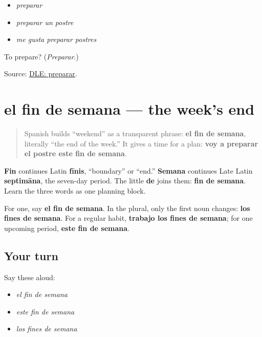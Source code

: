 \begin{itemize}
\raggedright
  \item \emph{preparar}
  \item \emph{preparar un postre}
  \item \emph{me gusta preparar postres}
\end{itemize}

\begin{tcolorbox}[breakable,colback=teal!4,colframe=teal!35!black,title={Before you move on}]
To prepare? (\emph{Preparar}.)

Source: \href{https://dle.rae.es/preparar}{DLE: preparar}.
\end{tcolorbox}
\section[el fin de semana]{el fin de semana — the week's end}

\label{lesson:ES-C409-fin-de-semana}



\begin{quote}
Spanish builds “weekend” as a transparent phrase: \textbf{el fin de semana}, literally “the end of the week.” It gives a time for a plan: \textbf{voy a preparar el postre este fin de semana}.
\end{quote}

\begin{cousinweb}
\textbf{Fin} continues Latin \textbf{fīnis}, “boundary” or “end.” \textbf{Semana} continues Late Latin \textbf{septimāna}, the seven-day period. The little \textbf{de} joins them: \textbf{fin de semana}. Learn the three words as one planning block.
\end{cousinweb}

\begin{grammarlens}[title={Grammar Lens: one weekend, many weekends}]
For one, say \textbf{el fin de semana}. In the plural, only the first noun changes: \textbf{los fines de semana}. For a regular habit, \textbf{trabajo los fines de semana}; for one upcoming period, \textbf{este fin de semana}.
\end{grammarlens}

\subsection*{Your turn}
Say these aloud:

\begin{itemize}
\raggedright
  \item \emph{el fin de semana}
  \item \emph{este fin de semana}
  \item \emph{los fines de semana}
\end{itemize}

